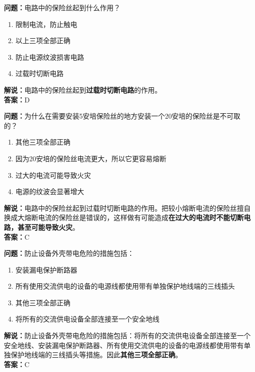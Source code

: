\bigskip


\noindent\textbf{问题：}电路中的保险丝起到什么作用？
\begin{enumerate}[label=\Alph*), leftmargin=3em]
	\item 限制电流，防止触电
	\item 以上三项全部正确
	\item 防止电源纹波损害电路
	\item 过载时切断电路
\end{enumerate}
\noindent\textbf{解说：}电路中的保险丝起到\textbf{过载时切断电路}的作用。\\\noindent\textbf{答案：}D
\bigskip


\noindent\textbf{问题：}为什么在需要安装5安培保险丝的地方安装一个20安培的保险丝是不可取的？
\begin{enumerate}[label=\Alph*), leftmargin=3em]
	\item 其他三项全部正确
	\item 因为20安培的保险丝电流更大，所以它更容易熔断
	\item 过大的电流可能导致火灾
	\item 电源的纹波会显著增大
\end{enumerate}
\noindent\textbf{解说：}电路中的保险丝起到过载时切断电路的作用。把较小熔断电流的保险丝擅自换成大熔断电流的保险丝是错误的，这样做有可能造成\textbf{在过大的电流时不能切断电路，甚至可能导致火灾}。\\\noindent\textbf{答案：}C%

\bigskip


\noindent\textbf{问题：}防止设备外壳带电危险的措施包括：
\begin{enumerate}[label=\Alph*), leftmargin=3em]
	\item 安装漏电保护断路器
	\item 所有使用交流供电的设备的电源线都使用带有单独保护地线端的三线插头
	\item 其他三项全部正确
	\item 将所有的交流供电设备全部连接至一个安全地线
\end{enumerate}
\noindent\textbf{解说：}防止设备外壳带电危险的措施包括：将所有的交流供电设备全部连接至一个安全地线、安装漏电保护断路器、所有使用交流供电的设备的电源线都使用带有单独保护地线端的三线插头等措施。因此\textbf{其他三项全部正确}。\\\noindent\textbf{答案：}C

\bigskip


